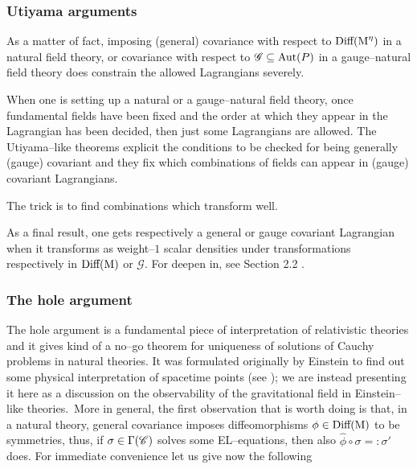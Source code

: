 





\subsubsection{Utiyama arguments}\label{utiyama}
As a matter of fact, imposing (general) covariance with respect to $\text{\normalfont Diff}(\text{\normalfont M}^\eta)$ in a natural field theory, or covariance with respect to $\mathscr{G}\subseteq\text{\normalfont Aut}(P)$ in a gauge--natural field theory does constrain the allowed Lagrangians severely.

When one is setting up a natural or a gauge--natural field theory, once fundamental fields have been fixed and the order at which they appear in the Lagrangian has been decided, then just some Lagrangians are allowed. The Utiyama--like theorems explicit the conditions to be checked for being generally (gauge) covariant and they fix which combinations of fields can appear in (gauge) covariant Lagrangians.

The trick is to find combinations which transform well.

As a final result, one gets respectively a general or gauge covariant Lagrangian when it transforms as weight--$1$ scalar densities under transformations respectively in $\text{\normalfont Diff}(\text{\normalfont M})$ or $\mathscr{G}$. For deepen in, see Section 2.2 \cite{fatib}.


\subsubsection{The hole argument}

The hole argument is a fundamental piece of interpretation of relativistic theories and it gives kind of a no--go theorem for uniqueness of solutions of Cauchy problems in natural theories. It was formulated originally by Einstein to find out some physical interpretation of spacetime points (see \cite{kertsh}); we are instead presenting it here as a discussion on the observability of the gravitational field in Einstein--like theories.\, More in general, the first observation that is worth doing is that, in a natural theory, general covariance imposes diffeomorphisms $\phi\in\text{\normalfont Diff}(\text{\normalfont M})$ to be symmetries, thus, if $\sigma\in\Gamma(\mathscr{C})$ solves some EL--equations, then also $\widehat{\phi}\circ\sigma=:\sigma'$ does. For immediate convenience let us give now the following

